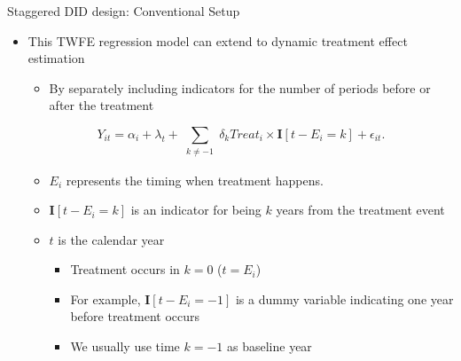 \documentclass[dvipsnames,hyperref={pdfpagelabels=false}]{beamer}
\begin{document}
\begin{frame}{Staggered DID design: Conventional Setup}{}
	\begin{itemize}
		\item This TWFE regression model can extend to dynamic treatment effect estimation
				\vspace{0.2cm}
			\begin{itemize}		
		\item By separately including indicators for the number of periods before or after the treatment
				\end{itemize}
						\vspace{0.2cm}	
		\begin{equation*}
			Y_{it} = \alpha_{i} + \lambda_{t}+ \sum_{\substack{k\neq-1}}\delta_{k} Treat_{i} \times \mathbf{I}[t-E_{i}=k] + \epsilon_{it}.
		\end{equation*}
		
		\begin{itemize}
			\item  $E_{i}$ represents the timing when treatment happens.
		\vspace{0.2cm}
		\item $\mathbf{I}[t-E_{i}=k]$ is an indicator for being $k$ years from the treatment event
		\vspace{0.2cm}
		\item $t$ is the calendar year
		\vspace{0.2cm}
		\begin{itemize}			
			\item Treatment occurs in $k=0$ ($t=E_{i}$)
			\vspace{0.2cm}
			\item For example, $\mathbf{I}[t-E_{i}=-1]$ is a dummy variable indicating one year before treatment occurs
			\vspace{0.2cm}
			\item We usually use time $k=-1$ as baseline year
			
		\end{itemize}
			
			
		\end{itemize}	
		
		
		
	\end{itemize}
\end{frame}
\end{document}
